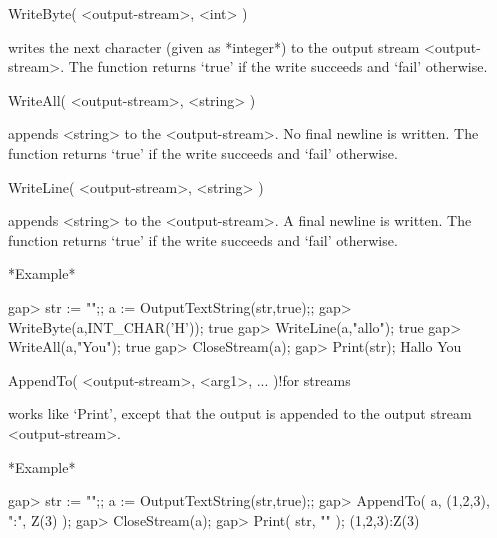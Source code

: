
\>WriteByte( <output-stream>, <int> )

writes the  next  character  (given  as *integer*)  to the  output stream
<output-stream>.  The function  returns `true' if  the write succeeds and
`fail' otherwise.

\>WriteAll( <output-stream>, <string> )

appends  <string> to the <output-stream>.   No final  newline is written.
The function returns `true' if the write succeeds and `fail' otherwise.

\>WriteLine( <output-stream>, <string> )

appends  <string> to  the <output-stream>.   A  final newline is written.
The function returns `true' if the write succeeds and `fail' otherwise.

*Example*

\beginexample
    gap> str := "";; a := OutputTextString(str,true);;
    gap> WriteByte(a,INT_CHAR('H'));
    true
    gap> WriteLine(a,"allo");
    true
    gap> WriteAll(a,"You\n");
    true
    gap> CloseStream(a);
    gap> Print(str);
    Hallo
    You
\endexample

\>AppendTo( <output-stream>, <arg1>, ... )!{for streams}

works like  `Print',  except that the  output is  appended to the  output
stream <output-stream>.

*Example*

\beginexample
    gap> str := "";; a := OutputTextString(str,true);;
    gap> AppendTo( a, (1,2,3), ":", Z(3) );
    gap> CloseStream(a);
    gap> Print( str, "\n" );
    (1,2,3):Z(3)
\endexample


